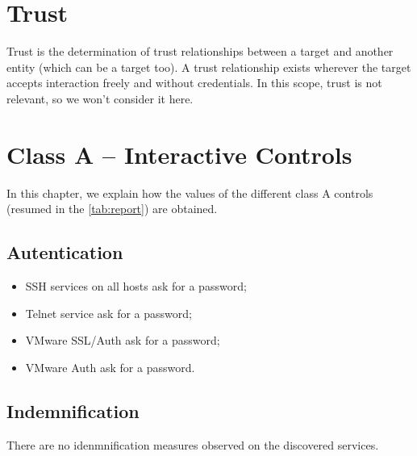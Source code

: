\documentclass[10pt,a4paper,twoside,onecolumn]{article}
\begin{document}

\section{Trust}

Trust is the determination of trust relationships between a target and another entity (which can be a target too). A trust relationship exists wherever the target accepts interaction freely and without credentials. In this scope, trust is not relevant, so we won't consider it here.


\section{Class A -- Interactive Controls}

In this chapter, we explain how the values of the different class A controls (resumed in the \autoref{tab:report}) are obtained.

\subsection{Autentication}
\begin{itemize}
	\setlength{\itemsep}{-3mm}
	\item SSH services on all hosts ask for a password;
	\item Telnet service ask for a password;
	\item VMware SSL/Auth ask for a password;
	\item VMware Auth ask for a password.
\end{itemize}

\subsection{Indemnification}

There are no idenmnification measures observed on the discovered services.
\end{document}
